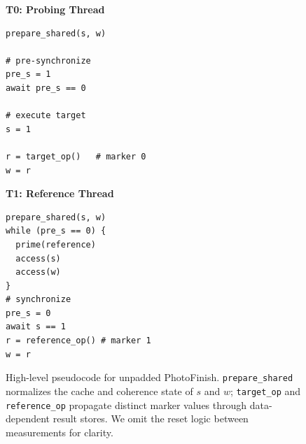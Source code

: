 \documentclass[letterpaper,twocolumn,10pt]{article} %
\newcommand{\code}[1]{\texttt{#1}\xspace}
\newcommand{\AttackName}{PhotoFinish\xspace}
\newcommand{\tprobe}{{\fontfamily{cmtt}\selectfont T0}\xspace}
\newcommand{\tref}{{\fontfamily{cmtt}\selectfont T1}\xspace}
\begin{document}
\begin{figure}[t]
  \begin{minipage}[t]{0.48\linewidth}
    \centering
    \small\textbf{\tprobe: Probing Thread}
    \begin{lstlisting}[language={},numbers=none,frame=single,
      basicstyle=\scriptsize\ttfamily,
      commentstyle=\scriptsize\itshape\color{gray!60!black},
      morekeywords={await,while},
      keywordstyle=\bfseries\color{blue!60!black},
      columns=fullflexible,breaklines=false,
      xleftmargin=12pt,xrightmargin=4pt,
      framexleftmargin=0pt,framexrightmargin=0pt,
      numbers=left,numbersep=5pt,
      numberstyle=\tiny\color{gray}]
prepare_shared(s, w)

# pre-synchronize
pre_s = 1
await pre_s == 0

# execute target
s = 1

r = target_op()   # marker 0
w = r
    \end{lstlisting}
  \end{minipage}
  \hspace{1em}
  \begin{minipage}[t]{0.43\linewidth}
    \centering
    \small\textbf{\tref: Reference Thread}
    \begin{lstlisting}[language={},numbers=none,frame=single,
      basicstyle=\scriptsize\ttfamily,
      commentstyle=\scriptsize\itshape\color{gray!60!black},
      morekeywords={await,while},
      keywordstyle=\bfseries\color{blue!60!black},
      columns=fullflexible,breaklines=false,
      xleftmargin=0pt,xrightmargin=0pt,
      framexleftmargin=0pt,framexrightmargin=0pt,
      numbers=left,numbersep=5pt,
      numberstyle=\tiny\color{gray}]
prepare_shared(s, w)
while (pre_s == 0) {
  prime(reference)
  access(s)
  access(w)
}
# synchronize
pre_s = 0
await s == 1
r = reference_op() # marker 1
w = r
    \end{lstlisting}
  \end{minipage}
  \caption{High-level pseudocode for unpadded \AttackName. \code{prepare\_shared} normalizes the cache and coherence state of $s$ and $w$; \code{target\_op} and \code{reference\_op} propagate distinct marker values through data-dependent result stores. We omit the reset logic between measurements for clarity.}
  \label{fig:pseudocode-unpadded}
\end{figure}
\end{document}
